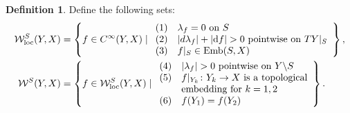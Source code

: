 \documentclass[10pt,a4paper]{amsart}
\numberwithin{equation}{section}
\theoremstyle{definition}
\newtheorem{Definition}[Theorem]{Definition}
\newcommand{\1}{{\bf 1}}
\newcommand{\loc}{\mathrm{loc}}
\begin{document}
\begin{Definition}\label{def_whitney} Define the following sets:
\begin{align*}
	\mathcal W_\loc^S(Y,X)&= \left\{f\in C^\infty(Y,X)\mid \begin{array}{ll}{\rm (1)}&\lambda_f=0 \text{ on } S\\
	 {\rm (2)}&|d\lambda_f| + |{\rm d}f| > 0 \text{ pointwise on } TY|_S \\
	 {\rm (3)}&f|_S\in \operatorname{Emb}(S,X)
	 \end{array}\right\},\\
	 \mathcal W^S(Y,X) &=\left\{f\in \mathcal W^S_\loc(Y,X)\mid \begin{array}
{ll}
 {\rm (4) } & |\lambda_f|>0\text{ pointwise on } Y\backslash S\\
{\rm (5)}& f|_{Y_k}\colon Y_k \to X \text{ is a topological}\\
	 &\text{embedding for } k=1,2\\
	 {\rm (6)}&f(Y_1)=f(Y_2)
	 \end{array}\right\}.
\end{align*}
\end{Definition}
\end{document}
